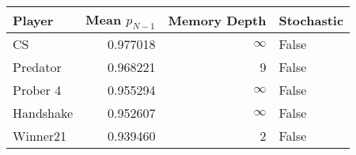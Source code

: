 \begin{tabular}{lrrl}
\toprule
    Player &  Mean $p_{N-1}$ &  Memory Depth & Stochastic \\
\midrule
        CS &        0.977018 &            \(\infty\) &      False \\
  Predator &        0.968221 &             9 &      False \\
  Prober 4 &        0.955294 &            \(\infty\) &      False \\
 Handshake &        0.952607 &            \(\infty\) &      False \\
  Winner21 &        0.939460 &             2 &      False \\
\bottomrule
\end{tabular}
